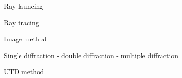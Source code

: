 \begin{pitemize}
 \item Ray launcing
\item Ray tracing
\item Image method
\item Single diffraction - double diffraction - multiple diffraction
\item UTD method 
\end{pitemize}
